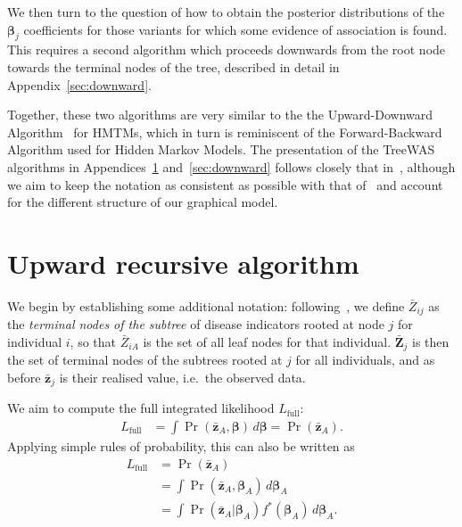 \documentclass[10pt]{article}
\newcommand{\B}{\symbf{\beta}}
\newcommand{\bz}{\bar{\symbf{z}}}
\begin{document}
We then turn to the question of how to obtain the posterior distributions of the $\B_j$ coefficients for those variants for which some evidence of association is found. This requires a second algorithm which proceeds downwards from the root node towards the terminal nodes of the tree, described in detail in Appendix~\ref{sec:downward}.

Together, these two algorithms are very similar to the the Upward-Downward Algorithm~\citep{Crouse1998} for HMTMs, which in turn is reminiscent of the Forward-Backward Algorithm used for Hidden Markov Models. The presentation of the TreeWAS algorithms in Appendices~\ref{sec:upward} and~\ref{sec:downward} follows closely that in~\cite{Durand2004}, although we aim to keep the notation as consistent as possible with that of~\cite{Cortes2017} and account for the different structure of our graphical model. 







\clearpage
\appendix
\section{Upward recursive algorithm}\label{sec:upward}

We begin by establishing some additional notation: following~\cite{Durand2004}, we define $\bar{Z}_{ij}$ as the \textit{terminal nodes of the subtree} of disease indicators rooted at node $j$ for individual $i$, so that $\bar{Z}_{iA}$ is the set of all leaf nodes for that individual. $\bar{\symbf{Z}}_{j}$ is then the set of terminal nodes of the subtrees rooted at $j$ for all individuals, and as before $\bz_{j}$ is their realised value, i.e.\ the observed data.


We aim to compute the full integrated likelihood $L_\text{full}$:
\begin{align*}
  L_\text{full} &= \int \Pr( \bz_A, \B )\, d\B
                  = \Pr( \bz_A).
\end{align*}
Applying simple rules of probability, this can also be written as
\begin{align}
  L_\text{full} &= \Pr( \bz_A) \nonumber\\
                &= \int \Pr( \bz_A, \B_A )\, d\B_A \nonumber\\
  &= \int \Pr( \bz_A | \B_A ) f^*(\B_A)  \, d\B_A. \label{eq:lfull3}
\end{align}
\end{document}
